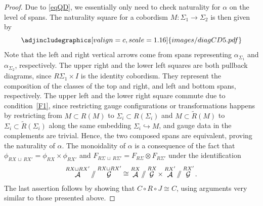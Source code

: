 \documentclass[pdftex]{sigma}
\DeclareMathOperator{\cala}{\mathcal{A}}
\DeclareMathOperator{\calg}{\mathcal{G}}
\newcommand{\sslash}{\mathbin{/\mkern-6mu/}}
\numberwithin{equation}{section}
\theoremstyle{definition}
\begin{document}
\begin{proof}
 Due to \eqref{eqQD}, we essentially only need to check naturality for $\alpha$ on the level of spans. The naturality square for a cobordism $M\colon \Sigma_1 \rightarrow \Sigma_2$ is then given by
 \[
 \centering
 \adjincludegraphics[valign=c, scale = 1.16]{images/diagCD5.pdf}
 \]
 Note that the left and right vertical arrows come from spans representing $\alpha_{\Sigma_1}$ and $\alpha_{\Sigma_2}$, respectively. The upper right and the lower left squares are both pullback diagrams, since $R\Sigma_1 \times I$ is the identity cobordism. They represent the composition of the classes of the top and right, and left and bottom spans, respectively. The upper left and the lower right square commute due to condition~\ref{F1}, since restricting gauge configurations or transformations happens by restricting from $M \subset R(M)$ to $\Sigma_i \subset R(\Sigma_i)$ and $M \subset \widetilde R(M)$ to $\Sigma_i \subset \widetilde R(\Sigma_i)$ along the same embedding $\Sigma_i \hookrightarrow M$, and gauge data in the complements are trivial. Hence, the two composed spans are equivalent, proving the naturality of $\alpha$. The monoidality of $\alpha$ is a consequence of the fact that $\phi_{RX \, \sqcup \,RX'} = \phi_{RX} \times \phi_{R X'}$ and $F_{R\Sigma \, \sqcup \, R\Sigma'} = F_{R\Sigma} \otimes F_{R \Sigma'}$ under the identification
 \begin{align*}
 \cala^{RX \sqcup RX'} \sslash \calg^{RX \sqcup RX'} \cong \cala^{RX} \sslash \calg^{RX} \times \cala^{RX'} \sslash \calg^{RX'}.
 \end{align*}
 The last assertion follows by showing that $C \circ R \circ J \cong C$, using arguments very similar to those presented above.
\end{proof}
\end{document}
